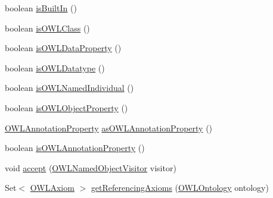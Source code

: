 \begin{DoxyCompactItemize}
\item 
boolean \hyperlink{classuk_1_1ac_1_1manchester_1_1cs_1_1owl_1_1owlapi_1_1_o_w_l_annotation_property_impl_a0d561897a645cf2018434621531470e7}{is\-Built\-In} ()
\item 
boolean \hyperlink{classuk_1_1ac_1_1manchester_1_1cs_1_1owl_1_1owlapi_1_1_o_w_l_annotation_property_impl_a1313f66a400a60841eec0e6723d70d28}{is\-O\-W\-L\-Class} ()
\item 
boolean \hyperlink{classuk_1_1ac_1_1manchester_1_1cs_1_1owl_1_1owlapi_1_1_o_w_l_annotation_property_impl_a09db190e19940ce5a4edc74be6828219}{is\-O\-W\-L\-Data\-Property} ()
\item 
boolean \hyperlink{classuk_1_1ac_1_1manchester_1_1cs_1_1owl_1_1owlapi_1_1_o_w_l_annotation_property_impl_a5cc36ac6b66c7faa647a0c8f936e10c4}{is\-O\-W\-L\-Datatype} ()
\item 
boolean \hyperlink{classuk_1_1ac_1_1manchester_1_1cs_1_1owl_1_1owlapi_1_1_o_w_l_annotation_property_impl_a25437a709a7e8d97d349fdaba66f10a5}{is\-O\-W\-L\-Named\-Individual} ()
\item 
boolean \hyperlink{classuk_1_1ac_1_1manchester_1_1cs_1_1owl_1_1owlapi_1_1_o_w_l_annotation_property_impl_a8faca92d38f9ed12c9c6a7c82a5bd008}{is\-O\-W\-L\-Object\-Property} ()
\item 
\hyperlink{interfaceorg_1_1semanticweb_1_1owlapi_1_1model_1_1_o_w_l_annotation_property}{O\-W\-L\-Annotation\-Property} \hyperlink{classuk_1_1ac_1_1manchester_1_1cs_1_1owl_1_1owlapi_1_1_o_w_l_annotation_property_impl_a902c6b1ee0278da5783d83233be4dd1f}{as\-O\-W\-L\-Annotation\-Property} ()
\item 
boolean \hyperlink{classuk_1_1ac_1_1manchester_1_1cs_1_1owl_1_1owlapi_1_1_o_w_l_annotation_property_impl_aae8e25a0db1ab7ab13bb57dc823f0bc6}{is\-O\-W\-L\-Annotation\-Property} ()
\item 
void \hyperlink{classuk_1_1ac_1_1manchester_1_1cs_1_1owl_1_1owlapi_1_1_o_w_l_annotation_property_impl_a1d9294a47a9032f5dc9ad3b069147d62}{accept} (\hyperlink{interfaceorg_1_1semanticweb_1_1owlapi_1_1model_1_1_o_w_l_named_object_visitor}{O\-W\-L\-Named\-Object\-Visitor} visitor)
\item 
Set$<$ \hyperlink{interfaceorg_1_1semanticweb_1_1owlapi_1_1model_1_1_o_w_l_axiom}{O\-W\-L\-Axiom} $>$ \hyperlink{classuk_1_1ac_1_1manchester_1_1cs_1_1owl_1_1owlapi_1_1_o_w_l_annotation_property_impl_aa7017c3ba8e84d8edf8362cc526df557}{get\-Referencing\-Axioms} (\hyperlink{interfaceorg_1_1semanticweb_1_1owlapi_1_1model_1_1_o_w_l_ontology}{O\-W\-L\-Ontology} ontology)
\item 

\end{DoxyCompactItemize}
